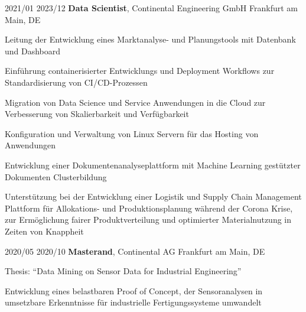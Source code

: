 \documentclass{maxcv}
\begin{document}
\vspace{0.2 cm}

\begin{twocolentry}{2021/01 \dash{} 2023/12}
    \textbf{Data Scientist}, Continental Engineering GmbH \dash{} Frankfurt am Main, DE
\end{twocolentry}
\vspace{0.10 cm}
\begin{onecolentry}
    \begin{highlights}
        \item Leitung der Entwicklung eines Marktanalyse- und Planungstools mit Datenbank und Dashboard
        \item Einführung containerisierter Entwicklungs und Deployment Workflows zur Standardisierung von CI/CD-Prozessen
        \item Migration von Data Science und Service Anwendungen in die Cloud zur Verbesserung von Skalierbarkeit und Verfügbarkeit
        \item Konfiguration und Verwaltung von Linux Servern für das Hosting von Anwendungen
        \item Entwicklung einer Dokumentenanalyseplattform mit Machine Learning gestützter Dokumenten Clusterbildung
        \item Unterstützung bei der Entwicklung einer Logistik und Supply Chain Management Plattform für Allokations- und Produktionsplanung während der Corona Krise, zur Ermöglichung fairer Produktverteilung und optimierter Materialnutzung in Zeiten von Knappheit
    \end{highlights}
\end{onecolentry}

\clearpage

\vspace{0.2 cm}

\begin{twocolentry}{2020/05 \dash{} 2020/10}
    \textbf{Masterand}, Continental AG \dash{} Frankfurt am Main, DE
\end{twocolentry}
\vspace{0.10 cm}
\begin{onecolentry}
    \begin{highlights}
        \item Thesis: ``Data Mining on Sensor Data for Industrial Engineering''
        \item Entwicklung eines belastbaren Proof of Concept, der Sensoranalysen in umsetzbare Erkenntnisse für industrielle Fertigungssysteme umwandelt
    \end{highlights}
\end{onecolentry}
\end{document}
